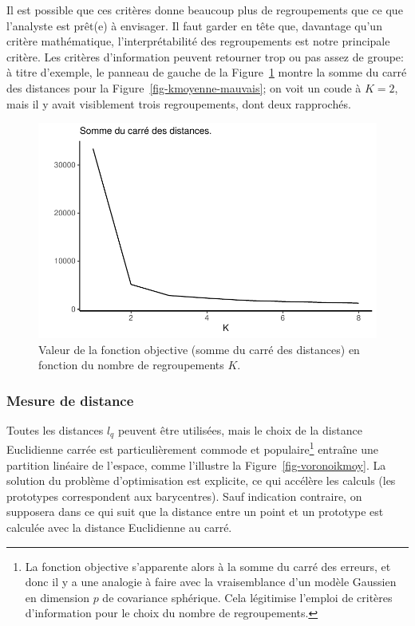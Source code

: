 \documentclass[
  11pt,
  letterpaper,
]{scrbook}
\theoremstyle{definition}
\theoremstyle{remark}
\begin{document}
Il est possible que ces critères donne beaucoup plus de regroupements
que ce que l'analyste est prêt(e) à envisager. Il faut garder en tête
que, davantage qu'un critère mathématique, l'interprétabilité des
regroupements est notre principale critère. Les critères d'information
peuvent retourner trop ou pas assez de groupe: à titre d'exemple, le
panneau de gauche de la Figure~\ref{fig-coudekmoy} montre la somme du
carré des distances pour la Figure~\ref{fig-kmoyenne-mauvais}; on voit
un coude à \(K=2\), mais il y avait visiblement trois regroupements,
dont deux rapprochés.

\begin{figure}[ht!]

{\centering \includegraphics{regroupements_files/figure-pdf/fig-coudekmoy-1.pdf}

}

\caption{\label{fig-coudekmoy}Valeur de la fonction objective (somme du
carré des distances) en fonction du nombre de regroupements \(K\).}

\end{figure}

\hypertarget{mesure-de-distance}{%
\subsubsection*{Mesure de distance}\label{mesure-de-distance}}

Toutes les distances \(l_q\) peuvent être utilisées, mais le choix de la
distance Euclidienne carrée est particulièrement commode et
populaire\footnote{La fonction objective s'apparente alors à la somme du
  carré des erreurs, et donc il y a une analogie à faire avec la
  vraisemblance d'un modèle Gaussien en dimension \(p\) de covariance
  sphérique. Cela légitimise l'emploi de critères d'information pour le
  choix du nombre de regroupements.} entraîne une partition linéaire de
l'espace, comme l'illustre la Figure~\ref{fig-voronoikmoy}. La solution
du problème d'optimisation est explicite, ce qui accélère les calculs
(les prototypes correspondent aux barycentres). Sauf indication
contraire, on supposera dans ce qui suit que la distance entre un point
et un prototype est calculée avec la distance Euclidienne au carré.
\end{document}
